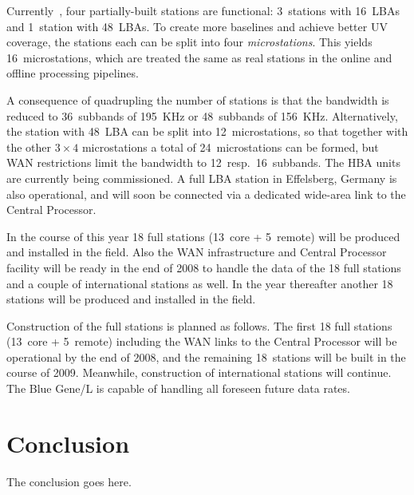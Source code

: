 \documentclass[journal]{IEEEtran}
\begin{document}
Currently~\cite{gunst:06}, four partially-built stations are functional: 3~stations with
16~LBAs and 1~station with 48~LBAs.
To create more baselines and achieve better UV coverage, the stations each can be split into four {\em microstations}.
This yields 16~microstations, which are treated the same as real stations in
the online and offline processing pipelines.

A consequence of quadrupling the number of stations is that the bandwidth
is reduced to 36~subbands of 195~KHz or 48~subbands of 156~KHz.
Alternatively, the station with 48~LBA can be split into 12~microstations,
so that together with the other $3\times4$ microstations a total of
24~microstations can be formed,
but WAN restrictions limit the bandwidth to 12~resp.\ 16~subbands.
The HBA units are currently being commissioned.
A full LBA station in Effelsberg, Germany is also operational, and will soon
be connected via a dedicated wide-area link to the Central Processor.

In the course of this year 18 full stations (13~core + 5~remote) will be produced and installed in the field. Also the WAN infrastructure and Central Processor facility will be ready in the end of 2008 to handle the data of the 18 full stations and a couple of international stations as well. In the year thereafter another 18 stations will be produced and installed in the field.

Construction of the full stations is planned as follows.
The first 18 full stations (13~core + 5~remote) 
including the WAN links to the Central Processor will be operational by the
end of 2008, and the remaining 18~stations will be built in the course of 2009.
Meanwhile, construction of international stations will continue.
The Blue Gene/L is capable of handling all foreseen future data rates.


\section{Conclusion}
The conclusion goes here.
\end{document}
